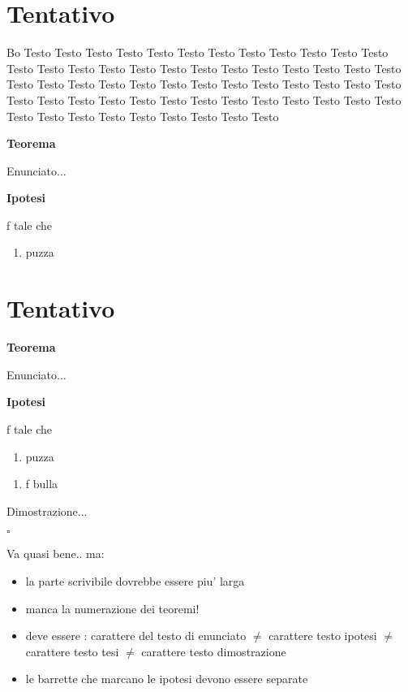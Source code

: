 \documentclass[a4paper,12pt]{article}
\newenvironment{Teorema}%
    {%
    \begin{framed}
      \textbf{\textsf{Teorema}}%
    }
    {%
    \end{framed}%
    }%
\newenvironment{Ipotesi}%
    {%
    \begin{leftbar}
      \textbf{\textsf{Ipotesi}}
    }
    {%
    \end{leftbar}%
    }%
\newenvironment{Teorema2}%
    {%
    \begin{mdframed}[linecolor=red]
      \textbf{\textsf{Teorema}}%
    }
    {%
    \end{mdframed}%
    }%
\newenvironment{Dimostrazione2}%
    {%
    \begin{mdframed}[style = dotted,linecolor=red,topline
=false,frametitle={Dimostrazione}]
    }
    {%
    	\begin{flushright}
			$\square$
		\end{flushright}
    \end{mdframed}%
    }%
\newenvironment{Tesi2}%
    {%
    \begin{mdframed}[bottomline=false,rightline=false,linecolor=red,frametitle={Tesi:}]
    }
    {%
    \end{mdframed}%
    }%
\begin{document}
\section{Tentativo}
Bo
Testo Testo Testo Testo Testo Testo Testo Testo Testo Testo Testo Testo Testo Testo Testo Testo Testo Testo Testo Testo Testo Testo Testo Testo Testo Testo Testo Testo Testo Testo Testo Testo Testo Testo Testo Testo Testo Testo Testo Testo Testo Testo Testo Testo Testo Testo Testo Testo Testo Testo Testo Testo Testo Testo Testo Testo Testo Testo Testo Testo 
\begin{Teorema}
Enunciato...

	\begin{Ipotesi}
	f tale che
		\begin{enumerate}
		\item puzza
		\end{enumerate}
	\end{Ipotesi}

\end{Teorema}




\section{Tentativo}

\begin{Teorema2}
	Enunciato...
	\begin{Ipotesi}
	f tale che
		\begin{enumerate}
		\item puzza
		\end{enumerate}
	\end{Ipotesi}

	\begin{Tesi2}
		\begin{enumerate}
		\item f bulla
		\end{enumerate}
	\end{Tesi2}

\end{Teorema2}

\begin{Dimostrazione2}
	Dimostrazione...

\end{Dimostrazione2}

Va quasi bene.. ma:
\begin{itemize}
\item la parte scrivibile dovrebbe essere piu' larga
\item manca la numerazione dei teoremi!
\item deve essere : carattere del testo di enunciato $\neq$ carattere testo ipotesi $\neq$ carattere testo tesi $\neq$ carattere testo dimostrazione
\item le barrette che marcano le ipotesi devono essere separate

\end{itemize}
\end{document}

